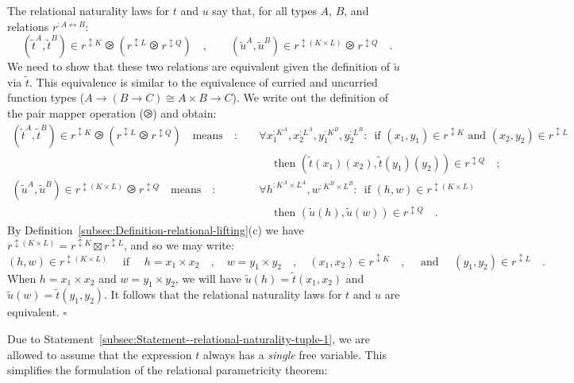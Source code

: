 The relational naturality laws for $t$ and $u$ say that, for all
types $A$, $B$, and relations $r^{:A\leftrightarrow B}$:
\[
(\tilde{t}^{A},\tilde{t}^{B})\in r^{\updownarrow K}\ogreaterthan(r^{\updownarrow L}\ogreaterthan r^{\updownarrow Q})\quad,\quad\quad(\tilde{u}^{A},\tilde{u}^{B})\in r^{\updownarrow(K\times L)}\ogreaterthan r^{\updownarrow Q}\quad.
\]
We need to show that these two relations are equivalent given the
definition of $\tilde{u}$ via $\tilde{t}$. This equivalence is similar
to the equivalence of curried and uncurried function types ($A\rightarrow(B\rightarrow C)\cong A\times B\rightarrow C$).
We write out the definition of the pair mapper operation ($\ogreaterthan$)
and obtain: 
\begin{align*}
(\tilde{t}^{A},\tilde{t}^{B})\in r^{\updownarrow K}\ogreaterthan(r^{\updownarrow L}\ogreaterthan r^{\updownarrow Q})\quad\text{means}\quad: & \quad\forall x_{1}^{:K^{A}},x_{2}^{:L^{A}},y_{1}^{:K^{B}},y_{2}^{:L^{B}}:\,\text{ if }(x_{1},y_{1})\in r^{\updownarrow K}\text{ and }(x_{2},y_{2})\in r^{\updownarrow L}\\
 & \quad\quad\text{ then }(\tilde{t}(x_{1})(x_{2}),\tilde{t}(y_{1})(y_{2}))\in r^{\updownarrow Q}\quad;\\
(\tilde{u}^{A},\tilde{u}^{B})\in r^{\updownarrow(K\times L)}\ogreaterthan r^{\updownarrow Q}\quad\text{means}\quad: & \quad\forall h^{:K^{A}\times L^{A}},w^{:K^{B}\times L^{B}}:\,\text{ if }(h,w)\in r^{\updownarrow(K\times L)}\\
 & \quad\quad\text{ then }(\tilde{u}(h),\tilde{u}(w))\in r^{\updownarrow Q}\quad.
\end{align*}
By Definition~\ref{subsec:Definition-relational-lifting}(c) we have
$r^{\updownarrow(K\times L)}=r^{\updownarrow K}\boxtimes r^{\updownarrow L}$,
and so we may write: 
\[
(h,w)\in r^{\updownarrow(K\times L)}\quad\text{ if }\quad h=x_{1}\times x_{2}\quad,\quad w=y_{1}\times y_{2}\quad,\quad(x_{1},x_{2})\in r^{\updownarrow K}\quad,\quad\text{ and }\quad(y_{1},y_{2})\in r^{\updownarrow L}\quad.
\]
When $h=x_{1}\times x_{2}$ and $w=y_{1}\times y_{2}$, we will have
$\tilde{u}(h)=\tilde{t}(x_{1},x_{2})$ and $\tilde{u}(w)=\tilde{t}(y_{1},y_{2})$.
It follows that the relational naturality laws for $t$ and $u$ are
equivalent. $\square$

Due to Statement~\ref{subsec:Statement--relational-naturality-tuple-1},
we are allowed to assume that the expression $t$ always has a \emph{single}
free variable. This simplifies the formulation of the relational parametricity
theorem:

